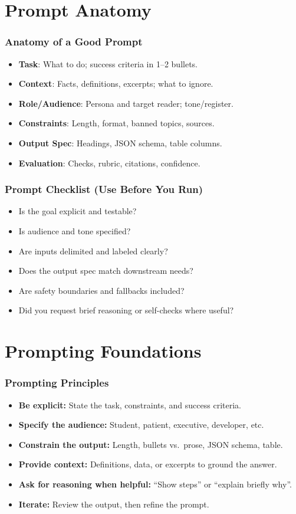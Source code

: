 \documentclass{beamer}
\begin{document}
\section{Prompt Anatomy}

\begin{frame}
	\frametitle{Anatomy of a Good Prompt}
	\begin{itemize}
		\item \textbf{Task}: What to do; success criteria in 1--2 bullets.
		\item \textbf{Context}: Facts, definitions, excerpts; what to ignore.
		\item \textbf{Role/Audience}: Persona and target reader; tone/register.
		\item \textbf{Constraints}: Length, format, banned topics, sources.
		\item \textbf{Output Spec}: Headings, JSON schema, table columns.
		\item \textbf{Evaluation}: Checks, rubric, citations, confidence.
	\end{itemize}
\end{frame}

\begin{frame}
	\frametitle{Prompt Checklist (Use Before You Run)}
	\begin{itemize}
		\item Is the goal explicit and testable?
		\item Is audience and tone specified?
		\item Are inputs delimited and labeled clearly?
		\item Does the output spec match downstream needs?
		\item Are safety boundaries and fallbacks included?
		\item Did you request brief reasoning or self-checks where useful?
	\end{itemize}
\end{frame}

\section{Prompting Foundations}

\begin{frame}
	\frametitle{Prompting Principles}
	\begin{itemize}
		\item \textbf{Be explicit:} State the task, constraints, and success criteria.
		\item \textbf{Specify the audience:} Student, patient, executive, developer, etc.
		\item \textbf{Constrain the output:} Length, bullets vs.~prose, JSON schema, table.
		\item \textbf{Provide context:} Definitions, data, or excerpts to ground the answer.
		\item \textbf{Ask for reasoning when helpful:} ``Show steps'' or ``explain briefly why''.
		\item \textbf{Iterate:} Review the output, then refine the prompt.
	\end{itemize}
\end{frame}
\end{document}
